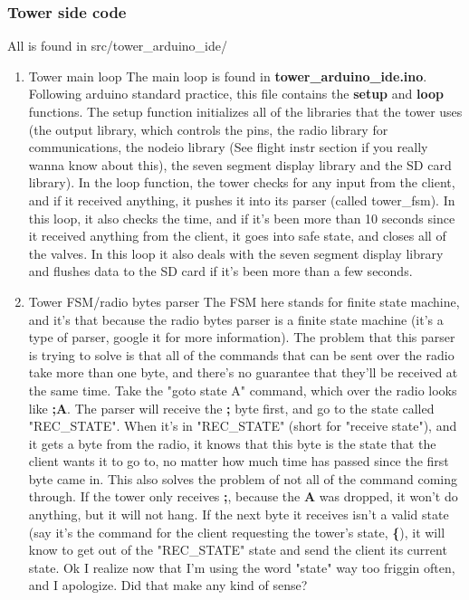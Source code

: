 \documentclass[11pt]{article}
\begin{document}
\subsubsection{Tower side code}
\label{sec:orgd1d744b}

All is found in src/tower\_arduino\_ide/

\begin{enumerate}
\item Tower main loop
\label{sec:orgaf1e504}
The main loop is found in \textbf{tower\_arduino\_ide.ino}. Following arduino standard
practice, this file contains the \textbf{setup} and \textbf{loop} functions. The setup
function initializes all of the libraries that the tower uses (the output
library, which controls the pins, the radio library for communications, the
nodeio library (See flight instr section if you really wanna know about this),
the seven segment display library and the SD card library). In the loop
function, the tower checks for any input from the client, and if it received
anything, it pushes it into its parser (called tower\_fsm). In this loop, it also
checks the time, and if it's been more than 10 seconds since it received
anything from the client, it goes into safe state, and closes all of the
valves. In this loop it also deals with the seven segment display library and
flushes data to the SD card if it's been more than a few seconds.

\item Tower FSM/radio bytes parser
\label{sec:org30164ee}
The FSM here stands for finite state machine, and it's that because the radio
bytes parser is a finite state machine (it's a type of parser, google it for
more information). The problem that this parser is trying to solve is that all
of the commands that can be sent over the radio take more than one byte, and
there's no guarantee that they'll be received at the same time. Take the "goto
state A" command, which over the radio looks like \textbf{;A}. The parser will receive
the \textbf{;} byte first, and go to the state called "REC\_STATE". When it's in
"REC\_STATE" (short for "receive state"), and it gets a byte from the radio, it
knows that this byte is the state that the client wants it to go to, no matter
how much time has passed since the first byte came in. This also solves the
problem of not all of the command coming through. If the tower only receives
\textbf{;}, because the \textbf{A} was dropped, it won't do anything, but it will not hang. If
the next byte it receives isn't a valid state (say it's the command for the
client requesting the tower's state, \textbf{\{}), it will know to get out of the
"REC\_STATE" state and send the client its current state. Ok I realize now that
I'm using the word "state" way too friggin often, and I apologize. Did that make
any kind of sense?



\end{enumerate}
\end{document}

